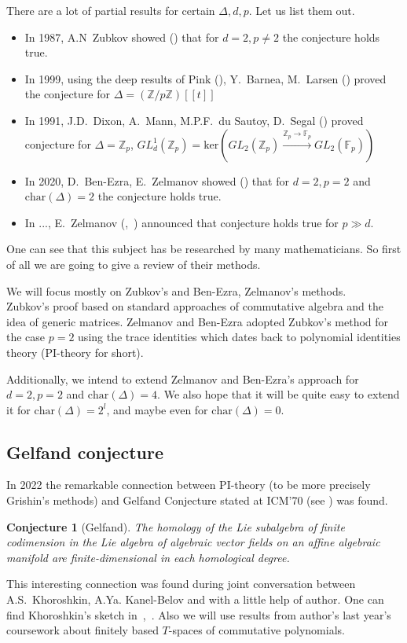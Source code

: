 \documentclass[12pt,a4paper]{article}
\newtheorem*{conjecture*}{Conjecture}
\begin{document}
    There are a lot of partial results for certain $\Delta, d, p$.
    Let us list them out.
    \begin{itemize}
        \item In 1987, A.N\ Zubkov showed (\cite{Zubkov}) that for $d=2, p\neq2$ the conjecture holds true.
        \item In 1999, using the deep results of Pink (\cite{Pink}), Y.\ Barnea, M.\ Larsen (\cite{Barnea-Larsen}) proved the conjecture for $\Delta=\left( \mathbb{Z}/p\mathbb{Z} \right)[[t]]$
        \item In 1991, J.D.\ Dixon, A.\ Mann, M.P.F.\ du Sautoy, D.\ Segal (\cite{DMSD}) proved conjecture for $\Delta=\mathbb{Z}_p$, $GL_d^1(\mathbb{Z}_p)=\mathrm{ker}\left( GL_2(\mathbb{Z}_p) \xrightarrow{\mathbb{Z}_p\to\mathbb{F}_p} GL_2(\mathbb{F}_p) \right)$
        \item In 2020, D.\ Ben-Ezra, E.\ Zelmanov showed (\cite{Ben-Ezra-Zelmanov}) that for $d=2, p=2$ and $\mathrm{char}(\Delta)=2$  the conjecture holds true.
        \item In ..., E.\ Zelmanov (\cite{Zelmanov1},~\cite{Zelmanov2}) announced that conjecture holds true for $p\gg d$.
    \end{itemize}

    One can see that this subject has be researched by many mathematicians.
    So first of all we are going to give a review of their methods.

    We will focus mostly on Zubkov's and Ben-Ezra, Zelmanov's methods.\\
    Zubkov's proof based on standard approaches of commutative algebra and the idea of generic matrices.
    Zelmanov and Ben-Ezra adopted Zubkov's method for the case $p=2$ using the trace identities which dates back to polynomial identities theory (PI-theory for short).

    Additionally, we intend to extend Zelmanov and Ben-Ezra's approach for $d=2, p=2$ and $\mathrm{char}(\Delta)=4$.
    We also hope that it will be quite easy to extend it for $\mathrm{char}(\Delta)=2^l$, and maybe even for $\mathrm{char}(\Delta)=0$.

    \subsection{Gelfand conjecture}
    In 2022 the remarkable connection between PI-theory (to be more precisely Grishin's methods) and Gelfand Conjecture stated at ICM’70 (see \cite{Gelfand}) was found.
    \vskip 0.1in\noindent
    \begin{conjecture*}[Gelfand]
        The homology of the Lie subalgebra of finite codimension in the Lie algebra of algebraic vector fields on an affine algebraic manifold are finite-dimensional in each
        homological degree.
    \end{conjecture*}
    \vskip 0.1in\noindent
    This interesting connection was found during joint conversation between A.S.\ Khoroshkin, A.Ya. Kanel-Belov and with a little help of author.
    One can find Khoroshkin's sketch in~\cite{Feigin-Kanel-Khoroshkin},~\cite{Centrone-Kanel-Khoroshkin-Vorobiov}.
    Also we will use results from author's last year's coursework about finitely based $T$-spaces of commutative polynomials.
\end{document}
